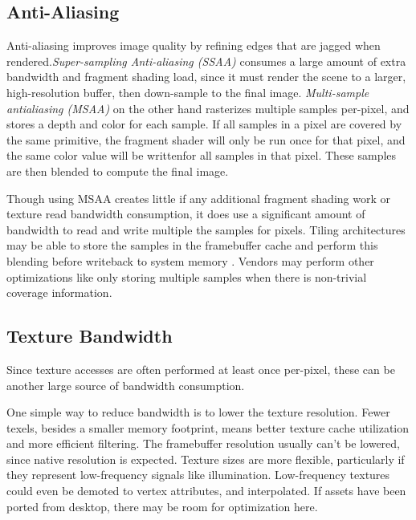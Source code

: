 \subsection{Anti-Aliasing}
 Anti-aliasing improves image quality by refining edges
that are jagged when rendered.\textit{Super-sampling Anti-aliasing (SSAA)}
consumes a large amount of extra bandwidth and fragment shading load, since it
must render the scene to a larger, high-resolution buffer, then down-sample to
the final image.  \textit{Multi-sample antialiasing (MSAA)} on the other hand
rasterizes multiple samples per-pixel, and stores a depth and color for each
sample.  If all samples in a pixel are covered by the same primitive, the
fragment shader will only be run once for that pixel, and the same color value
will be writtenfor all samples in that pixel.  These samples are then blended
to compute the final image. \cite{aths03}

Though using MSAA creates little if any additional fragment shading work or
texture read bandwidth consumption, it does use a significant amount of
bandwidth to read and write multiple the samples for pixels.  Tiling
architectures may be able to store the samples in the framebuffer cache and
perform this blending before writeback to system memory \cite{POWERVR11}.
Vendors may perform other optimizations like only storing multiple samples when
there is non-trivial coverage information.

\subsection{Texture Bandwidth}\label{JonMcCaffrey-Texture-Bandwidth} Since
texture accesses are often performed at least once per-pixel, these can be
another large source of bandwidth consumption.


One simple way to reduce bandwidth is to lower the texture resolution.  Fewer
texels, besides a smaller memory footprint, means better texture cache
utilization and more efficient filtering.  The framebuffer resolution usually
can't be lowered, since native resolution is expected.  Texture sizes are more
flexible, particularly if they represent low-frequency signals like
illumination.  Low-frequency textures could even be demoted to vertex
attributes, and interpolated.  If assets have been ported from desktop, there
may be room for optimization here.


